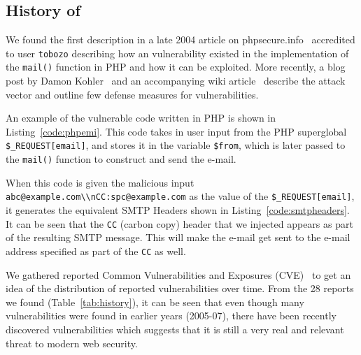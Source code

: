 \subsection{History of \ehi}
\vspace{-2ex}

We found the first \ehi description in a late 2004 article on phpsecure.info~\cite{Tobozo} accredited to user \lstinline|tobozo| describing how an \ehi vulnerability existed in the implementation of the \texttt{mail()} function in PHP and how it can be exploited. More recently, a blog post by Damon Kohler~\cite{DK} and an accompanying wiki article~\cite{Injection} describe the attack vector and outline few defense measures for \ehi vulnerabilities.


An example of the vulnerable code written in PHP is shown in Listing~\ref{code:phpemi}. This code takes in user input from the PHP superglobal \texttt{\$\_REQUEST[\textquotesingle email\textquotesingle]}, and stores it in the variable \texttt{\$from}, which is later passed to the \texttt{mail()} function to construct and send the e-mail.



\begin{sloppypar}
When this code is given the malicious input \texttt{\lstinline{abc@example.com\\nCC:spc@example.com}} as the value of the \texttt{\$\_REQUEST[\textquotesingle email\textquotesingle]}, it generates the equivalent SMTP Headers shown in Listing~\ref{code:smtpheaders}. It can be seen that the \texttt{CC} (carbon copy) header that we injected appears as part of the resulting SMTP message. This will make the e-mail get sent to the e-mail address specified as part of the \texttt{CC} as well. 

%
\end{sloppypar}

We gathered reported Common Vulnerabilities and Exposures
(CVE)~\cite{cve} to get an idea of the distribution of
reported \ehi vulnerabilities over time. From the 28 reports we found (Table~\ref*{tab:history}), it can be seen that even though many vulnerabilities were found in earlier years (2005-07), there have been recently discovered \ehi vulnerabilities which suggests that it is still a very real and relevant threat to modern web security.


